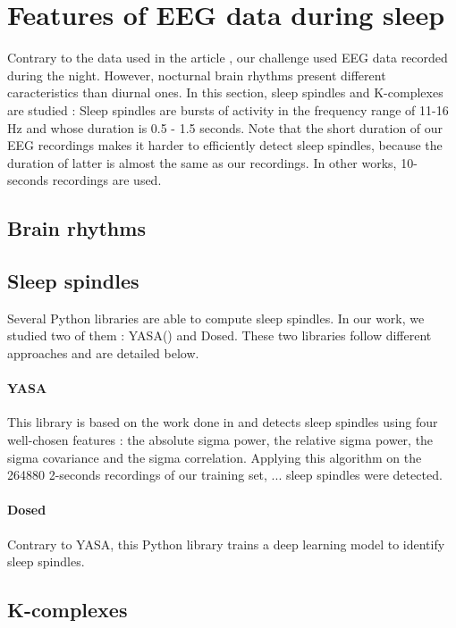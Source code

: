 \section{Features of EEG data during sleep}

Contrary to the data used in the article \cite{vanPutten2018}, our challenge used EEG data recorded during the night. However, nocturnal brain rhythms present different caracteristics than diurnal ones. In this section, sleep spindles and K-complexes are studied : 
Sleep spindles are bursts of activity in the frequency range of 11-16 Hz and whose duration is 0.5 - 1.5 seconds. 
Note that the short duration of our EEG recordings makes it harder to efficiently detect sleep spindles, because the duration of latter is almost the same as our recordings. In other works, 10-seconds recordings are used.

\subsection{Brain rhythms}

\subsection{Sleep spindles}


Several Python libraries are able to compute sleep spindles. In our work, we studied two of them : YASA()\cite{Vallat2020} and Dosed\cite{Chambon2018}. These two libraries follow different approaches and are detailed below. 

\paragraph{YASA} This library is based on the work done in \cite{Lacourse2019} and detects sleep spindles using four well-chosen features : 
the absolute sigma power, the relative sigma power, the sigma covariance and the sigma correlation.
Applying this algorithm on the 264880 2-seconds recordings of our training set, ... sleep spindles were detected.


\paragraph{Dosed} Contrary to YASA, this Python library trains a deep learning model to identify sleep spindles.


\subsection{K-complexes}